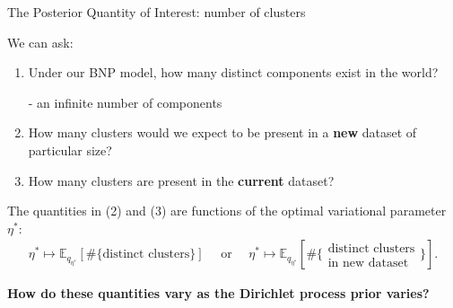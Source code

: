 \documentclass[10pt]{beamer}\usepackage[]{graphicx}\usepackage[]{color}
\newcommand{\Expect}{\mathbb{E}}
\begin{document}
\begin{frame}{The Posterior Quantity of Interest: number of clusters}

We can ask: 
\begin{enumerate}[(1)]
\item Under our BNP model, how many distinct components exist in the world? 
\pause\par 
- an infinite number of components  
\pause 

\item How many clusters would we expect to be present in a {\bf new} dataset of particular size?

\pause

\item How many clusters are present in the {\bf current} dataset?
\pause

\end{enumerate}
\vspace{0.2in}
The quantities in (2) and (3) are functions of the optimal variational parameter $\eta^*$: 
%
\begin{align*}
\eta^* \mapsto
\Expect_{q_{\eta^*}} \left[ \#\{\text{distinct clusters}\} \right]
\quad \text{ or } \quad
\eta^* \mapsto
\Expect_{q_{\eta^*}} 
\left[\#\{\substack{\text{distinct clusters}\\\text{in new dataset}}\} \right].
\end{align*}

\begin{mdframed}[style=MyFrame]
\begin{center} 
{\bf How do these quantities vary as the Dirichlet process prior varies?}
\end{center}
\end{mdframed}

\end{frame}
\end{document}
